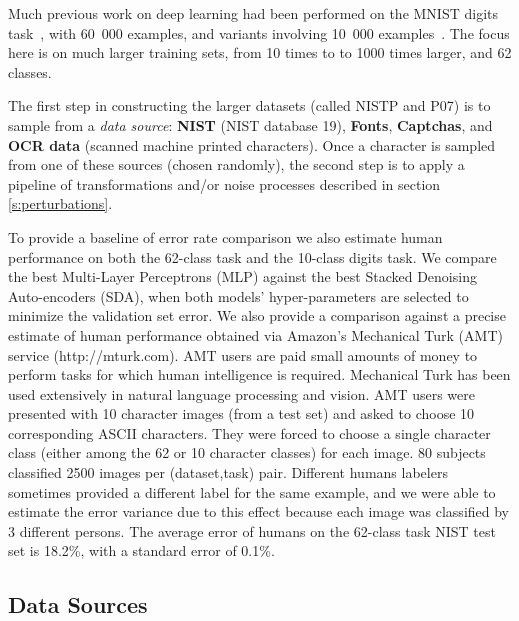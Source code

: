 \documentclass{article} %
\begin{document}
Much previous work on deep learning had been performed on
the MNIST digits task~\citep{Hinton06,ranzato-07-small,Bengio-nips-2006,Salakhutdinov+Hinton-2009},
with 60~000 examples, and variants involving 10~000
examples~\citep{Larochelle-jmlr-toappear-2008,VincentPLarochelleH2008}.
The focus here is on much larger training sets, from 10 times to 
to 1000 times larger, and 62 classes.

The first step in constructing the larger datasets (called NISTP and P07) is to sample from
a {\em data source}: {\bf NIST} (NIST database 19), {\bf Fonts}, {\bf Captchas},
and {\bf OCR data} (scanned machine printed characters). Once a character
is sampled from one of these sources (chosen randomly), the second step is to
apply a pipeline of transformations and/or noise processes described in section \ref{s:perturbations}.

To provide a baseline of error rate comparison we also estimate human performance
on both the 62-class task and the 10-class digits task.
We compare the best Multi-Layer Perceptrons (MLP) against
the best Stacked Denoising Auto-encoders (SDA), when
both models' hyper-parameters are selected to minimize the validation set error.
We also provide a comparison against a precise estimate
of human performance obtained via Amazon's Mechanical Turk (AMT)
service (http://mturk.com). 
AMT users are paid small amounts
of money to perform tasks for which human intelligence is required.
Mechanical Turk has been used extensively in natural language processing and vision.
AMT users were presented
with 10 character images (from a test set) and asked to choose 10 corresponding ASCII
characters. They were forced to choose a single character class (either among the
62 or 10 character classes) for each image.
80 subjects classified 2500 images per (dataset,task) pair.
Different humans labelers sometimes provided a different label for the same
example, and we were able to estimate the error variance due to this effect
because each image was classified by 3 different persons. 
The average error of humans on the 62-class task NIST test set
is 18.2\%, with a standard error of 0.1\%.

\subsection{Data Sources}
\end{document}
